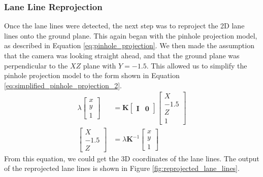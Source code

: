 \subsubsection{Lane Line Reprojection}
Once the lane lines were detected, the next step was to reproject the 2D lane lines onto the ground plane. This again began with the pinhole projection model, as described in Equation \ref{eq:pinhole_projection}. We then made the assumption that the camera was looking straight ahead, and that the ground plane was perpendicular to the $XZ$ plane with $Y = -1.5$. This allowed us to simplify the pinhole projection model to the form shown in Equation \ref{eq:simplified_pinhole_projection_2}.
\begin{equation}\label{eq:simplified_pinhole_projection_2}
\begin{aligned}
  \lambda\begin{bmatrix}
    x \\
    y \\
    1
  \end{bmatrix}
  & =
  \mathbf{K}
  \begin{bmatrix}
      \mathbf{I} & \mathbf{0}
  \end{bmatrix}
  \begin{bmatrix}
      X \\
      -1.5 \\
      Z \\
      1
  \end{bmatrix} \\
  \begin{bmatrix}
    X \\
    -1.5 \\
    Z
  \end{bmatrix}
  & =
  \lambda \mathbf{K}^{-1} \begin{bmatrix}
    x \\
    y \\
    1
  \end{bmatrix}
\end{aligned}
\end{equation}
From this equation, we could get the 3D coordinates of the lane lines. The output of the reprojected lane lines is shown in Figure \ref{fig:reprojected_lane_lines}.


